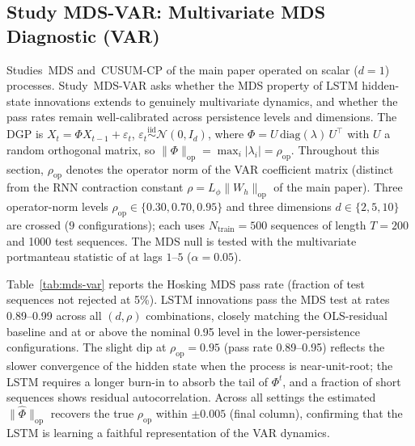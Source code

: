 \documentclass[bj,authoryear]{imsart}
\theoremstyle{plain}
\theoremstyle{definition}
\begin{document}
\subsection{Study MDS-VAR: Multivariate MDS Diagnostic (VAR)}
\label{app:supp-mdsvar}

Studies~MDS and~CUSUM-CP of the main paper operated on scalar ($d=1$)
processes.
Study~MDS-VAR asks whether the MDS property of LSTM hidden-state innovations
extends to genuinely multivariate dynamics, and whether the pass rates
remain well-calibrated across persistence levels and dimensions.
The DGP is $X_t = \Phi X_{t-1} + \varepsilon_t$,
$\varepsilon_t \overset{\text{iid}}{\sim}\mathcal{N}(0,I_d)$,
where $\Phi = U\,\mathrm{diag}(\lambda)\,U^\top$ with $U$ a random
orthogonal matrix, so $\|\Phi\|_{\mathrm{op}} = \max_i|\lambda_i| = \rho_{\mathrm{op}}$.
Throughout this section, $\rho_{\mathrm{op}}$ denotes the operator norm of
the VAR coefficient matrix (distinct from the RNN contraction constant
$\rho = L_\phi\|W_h\|_{\mathrm{op}}$ of the main paper).
Three operator-norm levels $\rho_{\mathrm{op}} \in \{0.30, 0.70, 0.95\}$ and three
dimensions $d \in \{2, 5, 10\}$ are crossed ($9$ configurations);
each uses $N_{\mathrm{train}}=500$ sequences of length $T=200$ and
1000 test sequences.
The MDS null is tested with the multivariate portmanteau statistic of
\citet{hosking1980multivariate} at lags $1$--$5$ ($\alpha=0.05$).

Table~\ref{tab:mds-var} reports the Hosking MDS pass rate (fraction of test
sequences not rejected at 5\%).
LSTM innovations pass the MDS test at rates 0.89--0.99 across all
$(d, \rho)$ combinations, closely matching the OLS-residual baseline
and at or above the nominal 0.95 level in the lower-persistence
configurations.
The slight dip at $\rho_{\mathrm{op}}=0.95$ (pass rate 0.89--0.95) reflects
the slower convergence of the hidden state when the process is near-unit-root;
the LSTM requires a longer burn-in to absorb the tail of $\Phi^t$, and a
fraction of short sequences shows residual autocorrelation.
Across all settings the estimated $\|\hat{\Phi}\|_{\mathrm{op}}$ recovers
the true $\rho_{\mathrm{op}}$ within $\pm 0.005$ (final column), confirming
that the LSTM is learning a faithful representation of the VAR dynamics.
\end{document}
